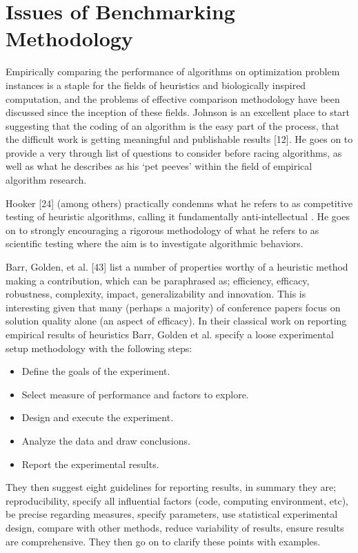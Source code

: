 \documentclass[a4paper, 11pt]{article}
\begin{document}
% 
% 
\section{Issues of Benchmarking Methodology}
Empirically	comparing	the	performance	of algorithms on optimization problem instances is a staple for the fields of heuristics and biologically inspired computation, and the problems of effective comparison methodology have been discussed since the inception of these fields. Johnson is an excellent place to start suggesting that the coding of an algorithm is the easy part of the process, that the difficult work is getting meaningful and publishable results [12]. He goes on to provide a very through list of questions to consider before racing algorithms, as well as what he describes as his `pet peeves' within the field of empirical algorithm research.

Hooker [24] (among others) practically condemns what he refers to as competitive testing of heuristic algorithms, calling it fundamentally anti-intellectual . He goes on to strongly encouraging a rigorous methodology of what he refers to as scientific testing where the aim is to investigate algorithmic behaviors. 


Barr, Golden, et al. [43] list a number of properties worthy of a heuristic method making a contribution, which can be paraphrased as; efficiency, efficacy, robustness, complexity, impact, generalizability and innovation. This is interesting given that many (perhaps a majority) of conference papers focus on solution quality alone (an aspect of efficacy).
In their classical work on reporting empirical results of heuristics Barr, Golden et al. specify a loose experimental setup methodology with the following steps:

\begin{itemize}
	\item Define the goals of the experiment.
	\item Select measure of performance and factors to explore.
	\item Design and execute the experiment.
	\item Analyze the data and draw conclusions.
	\item Report the experimental results.
\end{itemize}

They then suggest eight guidelines for reporting results, in summary they are; reproducibility, specify all influential factors (code, computing environment, etc), be precise regarding measures, specify parameters, use statistical experimental design, compare with other methods, reduce variability of results, ensure results are comprehensive. They then go on to clarify these points with examples.
\end{document}
